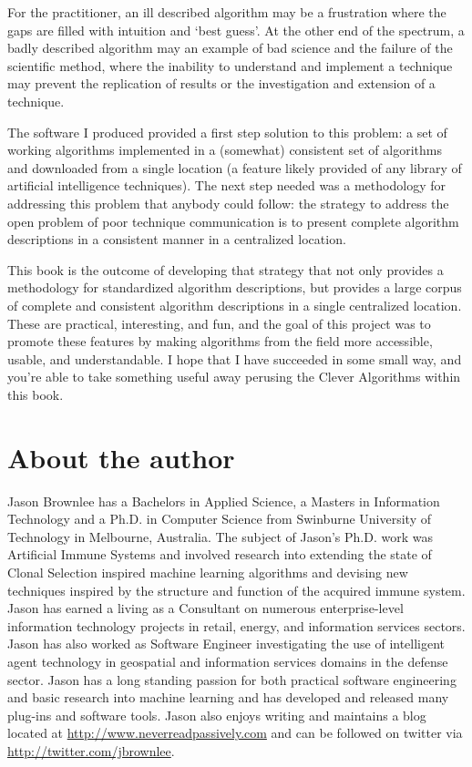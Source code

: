 For the practitioner, an ill described algorithm may be a frustration where the gaps are filled with intuition and `best guess'. At the other end of the spectrum, a badly described algorithm may an example of bad science and the failure of the scientific method, where the inability to understand and implement a technique may prevent the replication of results or the investigation and extension of a technique. 

The software I produced provided a first step solution to this problem: a set of working algorithms implemented in a (somewhat) consistent set of algorithms and downloaded from a single location (a feature likely provided of any library of artificial intelligence techniques). The next step needed was a methodology for addressing this problem that anybody could follow: the strategy to address the open problem of poor technique communication is to present complete algorithm descriptions in a consistent manner in a centralized location.

This book is the outcome of developing that strategy that not only provides a methodology for standardized algorithm descriptions, but provides a large corpus of complete and consistent algorithm descriptions in a single centralized location. 
These are practical, interesting, and fun, and the goal of this project was to promote these features by making algorithms from the field more accessible, usable, and understandable.
I hope that I have succeeded in some small way, and you're able to take something useful away perusing the Clever Algorithms within this book. 

% 
% 
\section*{About the author}
Jason Brownlee has a Bachelors in Applied Science, a Masters in Information Technology and a Ph.D. in Computer Science from Swinburne University of Technology in Melbourne, Australia. The subject of Jason's Ph.D. work was Artificial Immune Systems and involved research into extending the state of Clonal Selection inspired machine learning algorithms and devising new techniques inspired by the structure and function of the acquired immune system.
Jason has earned a living as a Consultant on numerous enterprise-level information technology projects in retail, energy, and information services sectors. Jason has also worked as Software Engineer investigating the use of intelligent agent technology in geospatial and information services domains in the defense sector.
Jason has a long standing passion for both practical software engineering and basic research into machine learning and has developed and released many plug-ins and software tools. Jason also enjoys writing and maintains a blog located at \url{http://www.neverreadpassively.com} and can be followed on twitter via \url{http://twitter.com/jbrownlee}. 

